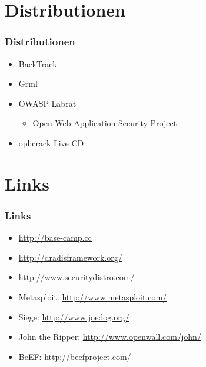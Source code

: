 \documentclass[11pt]{beamer}
\begin{document}
\section{Distributionen}
\label{sec-3}
\begin{frame}[fragile]\frametitle{Distributionen}
\label{sec-3-1}
\begin{itemize}

\item BackTrack\\
\label{sec-3-1-1}%
\item Grml\\
\label{sec-3-1-2}%
\item OWASP Labrat
\label{sec-3-1-3}%
\begin{itemize}

\item Open Web Application Security Project\\
\label{sec-3-1-3-1}%
\end{itemize} %

\item ophcrack Live CD\\
\label{sec-3-1-4}%
\end{itemize} %
\end{frame}
\section{Links}
\label{sec-4}
\begin{frame}[fragile]\frametitle{Links}
\label{sec-4-1}
\begin{itemize}

\item \href{http://base-camp.cc}{http://base-camp.cc}\\
\label{sec-4-1-1}%
\item \href{http://dradisframework.org/}{http://dradisframework.org/}\\
\label{sec-4-1-2}%
\item \href{http://www.securitydistro.com/}{http://www.securitydistro.com/}\\
\label{sec-4-1-3}%
\item Metasploit: \href{http://www.metasploit.com/}{http://www.metasploit.com/}\\
\label{sec-4-1-4}%
\item Siege: \href{http://www.joedog.org/}{http://www.joedog.org/}\\
\label{sec-4-1-5}%
\item John the Ripper: \href{http://www.openwall.com/john/}{http://www.openwall.com/john/}\\
\label{sec-4-1-6}%
\item BeEF: \href{http://beefproject.com/}{http://beefproject.com/}\\
\label{sec-4-1-7}%
\end{itemize} %
\end{frame}
\end{document}
